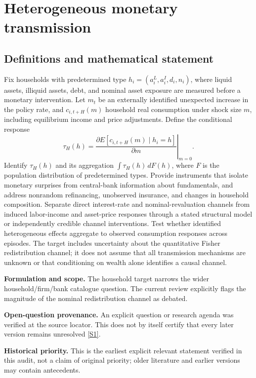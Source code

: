 \documentclass[11pt]{article}
\newcommand{\sref}[2]{\hyperlink{source:#1:#2}{[S#2]}}
\begin{document}
\section*{Heterogeneous monetary transmission}\label{30007525}
\subsection{Definitions and mathematical statement}
Fix households with predetermined type \(h_i=(a_i^{L},a_i^{I},d_i,n_i)\), where liquid assets, illiquid assets, debt, and nominal asset exposure are measured before a monetary intervention. Let \(m_t\) be an externally identified unexpected increase in the policy rate, and \(c_{i,t+H}(m)\) household real consumption under shock size \(m\), including equilibrium income and price adjustments. Define the conditional response
\[
\tau_H(h)=\left.\frac{\partial E[c_{i,t+H}(m)\mid h_i=h]}{\partial m}\right|_{m=0}.
\]
Identify \(\tau_H(h)\) and its aggregation \(\int\tau_H(h)\,dF(h)\), where \(F\) is the population distribution of predetermined types. Provide instruments that isolate monetary surprises from central-bank information about fundamentals, and address nonrandom refinancing, unobserved insurance, and changes in household composition. Separate direct interest-rate and nominal-revaluation channels from induced labor-income and asset-price responses through a stated structural model or independently credible channel interventions. Test whether identified heterogeneous effects aggregate to observed consumption responses across episodes. The target includes uncertainty about the quantitative Fisher redistribution channel; it does not assume that all transmission mechanisms are unknown or that conditioning on wealth alone identifies a causal channel.

\par\textbf{Formulation and scope.} The household target narrows the wider household/firm/bank catalogue question. The current review explicitly flags the magnitude of the nominal redistribution channel as debated.

\par\textbf{Open-question provenance.} An explicit question or research agenda was verified at the source locator. This does not by itself certify that every later version remains unresolved \sref{30007525}{1}.

\par\textbf{Historical priority.} This is the earliest explicit relevant statement verified in this audit, not a claim of original priority; older literature and earlier versions may contain antecedents.
\end{document}
